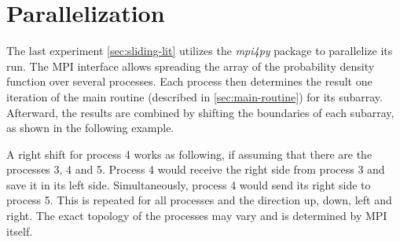 \section{Parallelization}\label{sec:parallelization}
The last experiment \cref{sec:sliding-lit} utilizes the \textit{mpi4py} package to parallelize its run.
The MPI interface allows spreading the array of the probability density function over several processes.
Each process then determines the result one iteration of the main routine (described in \cref{sec:main-routine}) for its subarray.
Afterward, the results are combined by shifting the boundaries of each subarray, as shown in the following example.
\newline

A right shift for process 4 works as following, if assuming that there are the processes 3, 4 and 5.
Process 4 would receive the right side from process 3 and save it in its left side.
Simultaneously, process 4 would send its right side to process 5.
This is repeated for all processes and the direction up, down, left and right.
The exact topology of the processes may vary and is determined by MPI itself.
